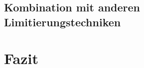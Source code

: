     \subsection{Kombination mit anderen Limitierungstechniken}
\section{Fazit}

\newpage



\listoffigures


